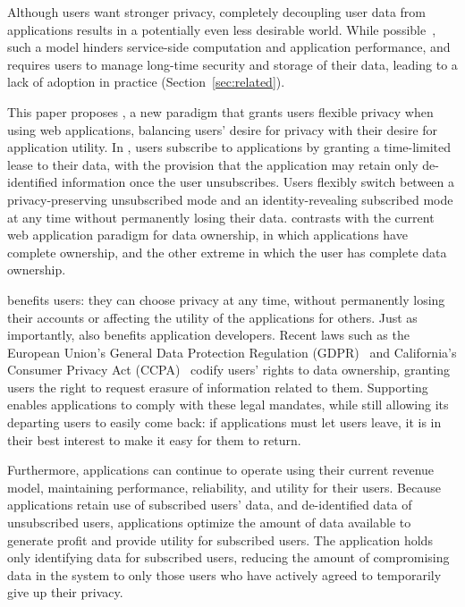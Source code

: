 Although users want stronger privacy, completely decoupling user data from applications results in a
potentially even less desirable world. While possible~\cite{solid, amber, w5, blockstack, bstore}, such a
model hinders service-side computation and application performance, and requires users to manage
long-time security and storage of their data, leading to a lack of adoption in practice (Section~\ref{sec:related}).

This paper proposes \name, a new paradigm that grants users flexible privacy when using web
applications, balancing users' desire for privacy with their desire for application utility. In
\name, users subscribe to applications by granting a time-limited lease to their data, with the
provision that the application may retain only de-identified information once the user unsubscribes.
Users flexibly switch between a privacy-preserving unsubscribed mode and an identity-revealing
subscribed mode at any time without permanently losing their data. \name contrasts
with the current web application paradigm for data ownership, in which applications have complete
ownership, and the other extreme in which the user has complete data ownership.%

\name benefits users: they can choose privacy at any time, without
permanently losing their accounts or affecting the utility of the applications for others.  Just as
importantly, \name also benefits application developers. Recent laws such as the
European Union's General Data Protection Regulation (GDPR)~\cite{eu:gdpr} and California's Consumer
Privacy Act (CCPA)~\cite{ca:privacy-act} codify users' rights to data ownership, granting users the
right to request erasure of information related to them. Supporting \name enables
applications to comply with these legal mandates, while still allowing its departing users to easily
come back: if applications must let users leave, it is in their best interest to make it easy for
them to return.

Furthermore, applications can continue to operate using their current revenue model, maintaining
performance, reliability, and utility for their users.  Because applications retain use of
subscribed users' data, and de-identified data of unsubscribed users, applications optimize the
amount of data available to generate profit and provide utility for subscribed users. The
application holds only identifying data for subscribed users, reducing the amount of
compromising data in the system to only those users who have actively agreed to temporarily give up
their privacy.

